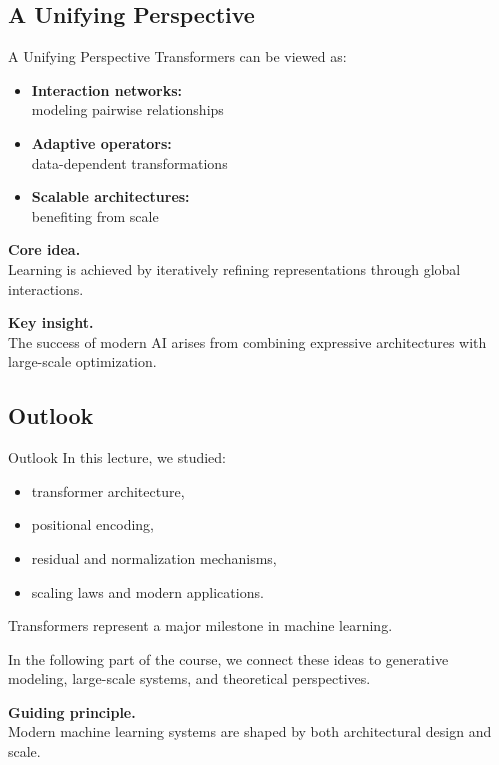 \documentclass[aspectratio=169,11pt]{beamer}
\begin{document}
\subsection{A Unifying Perspective}
\begin{frame}[t,allowframebreaks]{A Unifying Perspective}
\small
Transformers can be viewed as:

\begin{itemize}
    \item \textbf{Interaction networks:}\\ modeling pairwise relationships
    \item \textbf{Adaptive operators:}\\ data-dependent transformations
    \item \textbf{Scalable architectures:}\\ benefiting from scale
\end{itemize}

\textbf{Core idea.}\\ Learning is achieved by iteratively refining representations through global interactions.

\textbf{Key insight.}\\ The success of modern AI arises from combining expressive architectures with large-scale optimization.
\end{frame}

\subsection{Outlook}
\begin{frame}[t,allowframebreaks]{Outlook}
\small
In this lecture, we studied:

\begin{itemize}
    \item transformer architecture,
    \item positional encoding,
    \item residual and normalization mechanisms,
    \item scaling laws and modern applications.
\end{itemize}

Transformers represent a major milestone in machine learning.

In the following part of the course, we connect these ideas to generative modeling, large-scale systems, and theoretical perspectives.

\textbf{Guiding principle.}\\ Modern machine learning systems are shaped by both architectural design and scale.
\end{frame}
\end{document}
